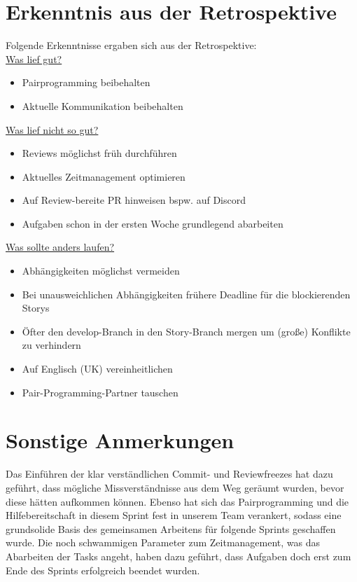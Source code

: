 \documentclass[12pt,a4paper, oneside]{article}
\begin{document}
    \section{Erkenntnis aus der Retrospektive}

    Folgende Erkenntnisse ergaben sich aus der Retrospektive:\\

    \underline{Was lief gut?}
    \begin{itemize}
        \item Pairprogramming beibehalten
        \item Aktuelle Kommunikation beibehalten
        \\
    \end{itemize}

    \underline{Was lief nicht so gut?}
    \begin{itemize}
        \item Reviews möglichst früh durchführen
        \item Aktuelles Zeitmanagement optimieren
        \item Auf Review-bereite PR hinweisen bspw. auf Discord
        \item Aufgaben schon in der ersten Woche grundlegend abarbeiten
        \\
    \end{itemize}

    \underline{Was sollte anders laufen?}
    \begin{itemize}
        \item Abhängigkeiten möglichst vermeiden
        \item Bei unausweichlichen Abhängigkeiten frühere Deadline für die blockierenden Storys
        \item Öfter den develop-Branch in den Story-Branch mergen um (große) Konflikte zu verhindern
        \item Auf Englisch (UK) vereinheitlichen
        \item Pair-Programming-Partner tauschen
    \end{itemize}


    \section{Sonstige Anmerkungen}
    Das Einführen der klar verständlichen Commit- und Reviewfreezes hat dazu geführt, dass mögliche Missverständnisse aus dem Weg geräumt wurden, bevor diese hätten aufkommen können. Ebenso hat sich das Pairprogramming und die Hilfebereitschaft in diesem Sprint fest in unserem Team verankert, sodass eine grundsolide Basis des gemeinsamen Arbeitens für folgende Sprints geschaffen wurde. Die noch schwammigen Parameter zum Zeitmanagement, was das Abarbeiten der Tasks angeht, haben dazu geführt, dass Aufgaben doch erst zum Ende des Sprints erfolgreich beendet wurden.
\end{document}
